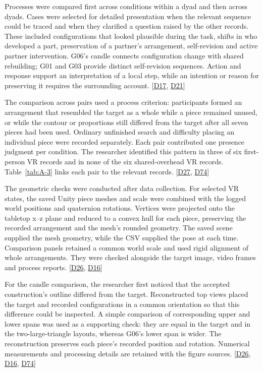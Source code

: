 Processes were compared first across conditions within a dyad and then across dyads. Cases were selected for detailed presentation when the relevant sequence could be traced and when they clarified a question raised by the other records. These included configurations that looked plausible during the task, shifts in who developed a part, preservation of a partner's arrangement, self-revision and active partner intervention. G06's candle connects configuration change with shared rebuilding; G01 and G03 provide distinct self-revision sequences. Action and response support an interpretation of a local step, while an intention or reason for preserving it requires the surrounding account. [\hyperlink{src:D17}{D17}, \hyperlink{src:D21}{D21}]

The comparison across pairs used a process criterion: participants formed an arrangement that resembled the target as a whole while a piece remained unused, or while the contour or proportions still differed from the target after all seven pieces had been used. Ordinary unfinished search and difficulty placing an individual piece were recorded separately. Each pair contributed one presence judgment per condition. The researcher identified this pattern in three of six first-person VR records and in none of the six shared-overhead VR records. Table~\ref{tab:A-3} links each pair to the relevant records. [\hyperlink{src:D27}{D27}, \hyperlink{src:D74}{D74}]

The geometric checks were conducted after data collection. For selected VR states, the saved Unity piece meshes and scale were combined with the logged world positions and quaternion rotations. Vertices were projected onto the tabletop x--z plane and reduced to a convex hull for each piece, preserving the recorded arrangement and the mesh's rounded geometry. The saved scene supplied the mesh geometry, while the CSV supplied the pose at each time. Comparison panels retained a common world scale and used rigid alignment of whole arrangements. They were checked alongside the target image, video frames and process reports. [\hyperlink{src:D26}{D26}, \hyperlink{src:D16}{D16}]

For the candle comparison, the researcher first noticed that the accepted construction's outline differed from the target. Reconstructed top views placed the target and recorded configurations in a common orientation so that this difference could be inspected. A simple comparison of corresponding upper and lower spans was used as a supporting check: they are equal in the target and in the two-large-triangle layouts, whereas G06's lower span is wider. The reconstruction preserves each piece's recorded position and rotation. Numerical measurements and processing details are retained with the figure sources. [\hyperlink{src:D26}{D26}, \hyperlink{src:D16}{D16}, \hyperlink{src:D74}{D74}]

